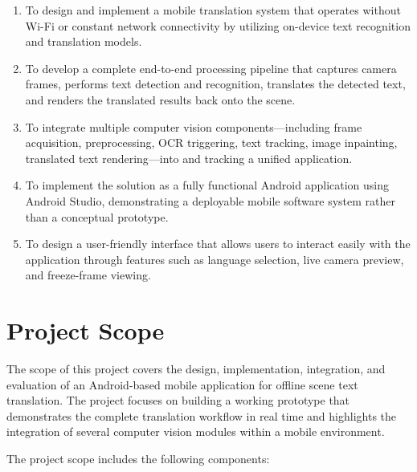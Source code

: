 \begin{enumerate}
    \item To design and implement a mobile translation system that operates without Wi-Fi or constant network connectivity by utilizing on-device text recognition and translation models.

    \item To develop a complete end-to-end processing pipeline that captures camera frames, performs text detection and recognition, translates the detected text, and renders the translated results back onto the scene.

    \item To integrate multiple computer vision components—including frame acquisition, preprocessing, OCR triggering, text tracking, image inpainting, translated text rendering—into and tracking a unified application.

    \item To implement the solution as a fully functional Android application using Android Studio, demonstrating a deployable mobile software system rather than a conceptual prototype.

    \item To design a user-friendly interface that allows users to interact easily with the application through features such as language selection, live camera preview, and freeze-frame viewing.
\end{enumerate}

\section{Project Scope}

The scope of this project covers the design, implementation, integration, and evaluation of an Android-based mobile application for offline scene text translation. The project focuses on building a working prototype that demonstrates the complete translation workflow in real time and highlights the integration of several computer vision modules within a mobile environment.

The project scope includes the following components:

